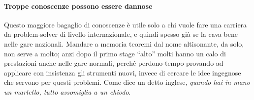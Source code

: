 \documentclass[a4paper,10pt]{paper}
\begin{document}
\paragraph{Troppe conoscenze possono essere dannose}
Questo maggiore bagaglio di conoscenze è utile solo a chi vuole fare una carriera da problem-solver di livello internazionale, e quindi spesso già se la cava bene nelle gare nazionali. Mandare a memoria teoremi dal nome altisonante, da solo, non serve a molto; anzi dopo il primo stage ``alto'' molti hanno un calo di prestazioni anche nelle gare normali, perché perdono tempo provando ad applicare con insistenza gli strumenti nuovi, invece di cercare le idee ingegnose che servono per questi problemi. Come dice un detto inglese, \emph{quando hai in mano un martello, tutto assomiglia a un chiodo}.
 
\printbibliography
 
\end{document}
